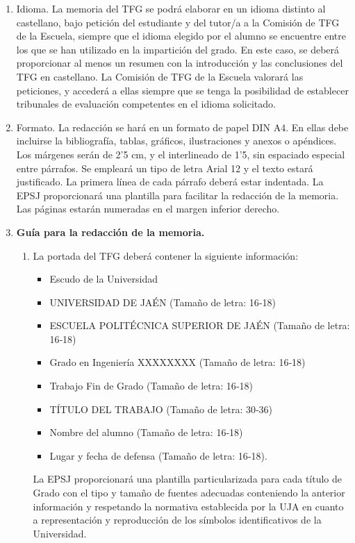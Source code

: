 \begin{enumerate}
\item Idioma. La memoria del TFG se podrá elaborar en un idioma distinto al castellano, bajo
  petición del estudiante y del tutor/a a la Comisión de TFG de la Escuela, siempre que el idioma
  elegido por el alumno se encuentre entre los que se han utilizado en la impartición del grado.
  En este caso, se deberá proporcionar al menos un resumen con la introducción y las
  conclusiones del TFG en castellano. La Comisión de TFG de la Escuela valorará las peticiones, y
  accederá a ellas siempre que se tenga la posibilidad de establecer tribunales de evaluación
  competentes en el idioma solicitado.

\item Formato. La redacción se hará en un formato de papel DIN A4. En ellas debe incluirse la
  bibliografía, tablas, gráficos, ilustraciones y anexos o apéndices. Los márgenes serán de 2’5 cm,
  y el interlineado de 1’5, sin espaciado especial entre párrafos. Se empleará un tipo de letra
  Arial 12 y el texto estará justificado. La primera línea de cada párrafo deberá estar indentada.
  La EPSJ proporcionará una plantilla para facilitar la redacción de la memoria. Las páginas
  estarán numeradas en el margen inferior derecho.  
\item \textbf{Guía para la redacción de la memoria.}
  \begin{enumerate}
  \item La portada del TFG deberá contener la siguiente información:
    \begin{itemize}
    \item Escudo de la Universidad
    \item UNIVERSIDAD DE JAÉN (Tamaño de letra: 16‐18)
    \item ESCUELA POLITÉCNICA SUPERIOR DE JAÉN (Tamaño de letra: 16‐18)
    \item Grado en Ingeniería XXXXXXXX (Tamaño de letra: 16‐18)
    \item Trabajo Fin de Grado (Tamaño de letra: 16‐18)
    \item TÍTULO DEL TRABAJO (Tamaño de letra: 30‐36)
    \item  Nombre del alumno (Tamaño de letra: 16‐18)
    \item Lugar y fecha de defensa (Tamaño de letra: 16‐18).
    \end{itemize}
    
    La EPSJ proporcionará una plantilla particularizada para cada título de Grado con el tipo y
    tamaño de fuentes adecuadas conteniendo la anterior información y respetando la normativa
    establecida por la UJA en cuanto a representación y reproducción de los símbolos
    identificativos de la Universidad.
    

\end{enumerate}
\end{enumerate}
